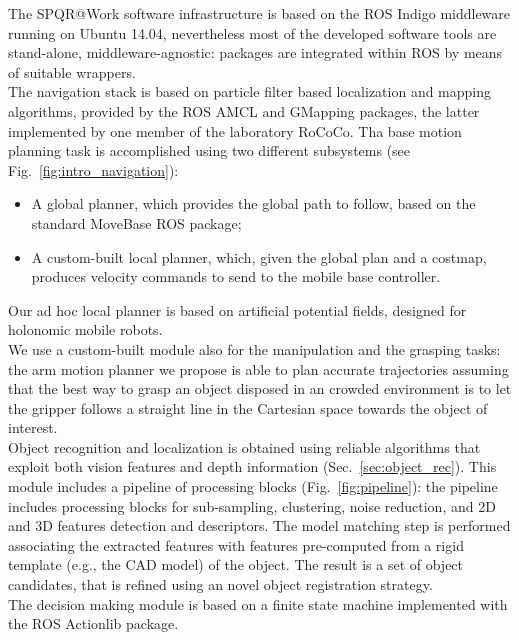 \documentclass[conference]{IEEEtran}
\begin{document}
The SPQR@Work software infrastructure is based on the ROS Indigo middleware \cite{rosweb} running on Ubuntu 14.04, nevertheless most of the developed software tools are stand-alone, middleware-agnostic: packages are integrated within ROS by means of suitable wrappers.\\
The navigation stack is based on particle filter based localization and mapping algorithms, provided by the ROS AMCL and GMapping \cite{Grisetti2007} packages, the latter implemented by one member of the laboratory RoCoCo.  Tha base motion planning task is accomplished using two different subsystems (see Fig.~\ref{fig:intro_navigation}):
\begin{itemize}
 \item A global planner, which provides the global path to follow, based on the standard MoveBase ROS package;
 \item A custom-built local planner, which, given the global plan and a costmap, produces
velocity commands to send to the mobile base controller.
\end{itemize}
Our ad hoc local planner is based on artificial potential fields, designed for holonomic mobile robots.\\

We use a custom-built module also for the manipulation and the grasping tasks: the arm motion planner we propose is able to plan accurate trajectories assuming that the best way to grasp an object disposed in an crowded environment is to let the gripper follows a straight line in the Cartesian space towards the object of interest.\\

Object recognition and localization is obtained using reliable algorithms that exploit both vision features and depth information (Sec.~\ref{sec:object_rec}). This module includes a pipeline of processing blocks (Fig.~\ref{fig:pipeline}): the pipeline includes processing blocks for sub-sampling, clustering, noise reduction, and 2D and 3D features detection and descriptors. The model matching step is performed associating the extracted features with features pre-computed from a rigid template (e.g., the CAD model) of the object. The result is a set of object candidates, that is refined using an novel object registration strategy. \\

The decision making module is based on a finite state machine implemented with the ROS Actionlib package.\\
\end{document}
